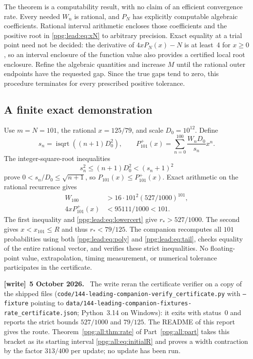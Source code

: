 \documentclass[11pt,letterpaper]{article}
\theoremstyle{remark}\newtheorem{remark}[theorem]{Remark}
\numberwithin{equation}{section}
\newcommand{\file}[1]{\nolinkurl{#1}}
\newenvironment{writenote}[1][]{\par\smallskip\begingroup\small
 \noindent\textbf{[write]}\if\relax\detokenize{#1}\relax\else~\textbf{#1.}\fi\ }%
 {\par\endgroup\smallskip}
\begin{document}
The theorem is a computability result, with no claim of an efficient convergence rate. Every needed $W_n$ is rational, and $P_N$ has explicitly computable algebraic coefficients. Rational interval arithmetic encloses those coefficients and the positive root in \eqref{ppg:lead:eq:xN} to arbitrary precision. Exact equality at a trial point need not be decided: the derivative of $4xP_N(x)-N$ is at least~4 for $x\ge0$, so an interval enclosure of the function value also provides a certified local root enclosure. Refine the algebraic quantities and increase $M$ until the rational outer endpoints have the requested gap. Since the true gaps tend to zero, this procedure terminates for every prescribed positive tolerance.

\subsection{A finite exact demonstration}
Use $m=N=101$, the rational $x=125/79$, and scale $D_0=10^{12}$. Define
\[
 s_n=\operatorname{isqrt}((n+1)D_0^2),\qquad
 P^{+}_{101}(x)=\sum_{n=0}^{100}\frac{W_nD_0}{s_n}x^n.
\]
The integer-square-root inequalities
\[
 s_n^2\le(n+1)D_0^2<(s_n+1)^2
\]
prove $0<s_n/D_0\le\sqrt{n+1}$, so $P_{101}(x)\le P^+_{101}(x)$. Exact arithmetic on the rational recurrence gives
\begin{align}
 W_{100}&>16\cdot101^2(527/1000)^{101},\label{ppg:lead:eq:finiteLower}\\
 4xP^+_{101}(x)&<95111/1000<101.\label{ppg:lead:eq:finiteUpper}
\end{align}
The first inequality and \eqref{ppg:lead:eq:lowercert} give $r_*>527/1000$. The second gives $x<x_{101}\le R$ and thus $r_*<79/125$. The companion recomputes all $101$ probabilities using both \eqref{ppg:lead:eq:poly} and \eqref{ppg:lead:eq:tail}, checks equality of the entire rational vector, and verifies these strict inequalities. No floating-point value, extrapolation, timing measurement, or numerical tolerance participates in the certificate.
\begin{writenote}[5 October 2026]
The write reran the certificate verifier on a copy of the shipped files (\file{code/144-leading-companion-verify_certificate.py} with \texttt{--fixture} pointing to \file{data/144-leading-companion-fixtures-rate_certificate.json}; Python~3.14 on Windows): it exits with status~0 and reports the strict bounds $527/1000$ and $79/125$. The README of this report gives the route. Theorem~\ref{ppg:all:thm:rate} of Part~\ref{ppg:all:part} takes this bracket as its starting interval \eqref{ppg:all:eq:initialR} and proves a width contraction by the factor $313/400$ per update; no update has been run.
\end{writenote}
\end{document}
